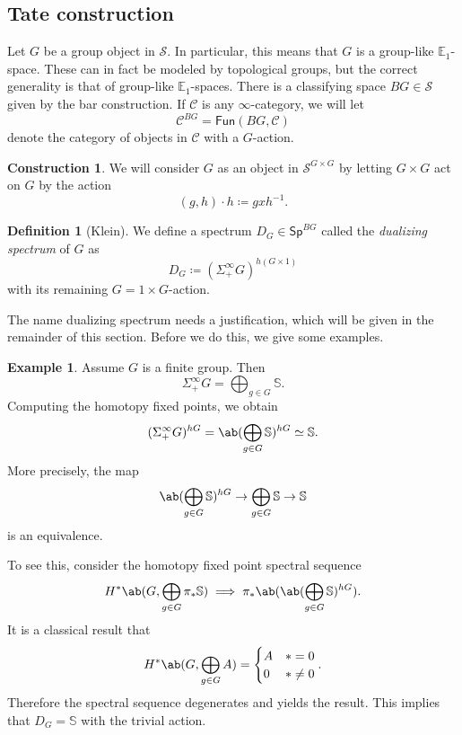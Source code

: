 \documentclass[10pt, oneside]{memoir}
\theoremstyle{definition}
\newtheorem{defn}[thm]{Definition}
\newtheorem{con}[thm]{Construction}
\newtheorem{exm}[thm]{Example}
\theoremstyle{remark}
\theoremstyle{plain}
\theoremstyle{definition}
\theoremstyle{remark}
\newcommand{\E}{\mathbb{E}}
\newcommand{\bS}{\mathbb{S}}
\newcommand{\mc}[1]{\mathcal{#1}}
\newcommand{\ms}[1]{\mathsf{#1}}
\newcommand{\1}{\mathbf{1}}
\newcommand{\2}{\mathbf{2}}
\newcommand{\3}{\mathbf{3}}
\begin{document}
\subsection{Tate construction}%
\label{sub:Tate construction}

Let $G$ be a group object in $\mc{S}$. In particular, this means that $G$ is a group-like $\E_1$-space. These can in fact be modeled by topological groups, but the correct generality is that of group-like $\E_1$-spaces. There is a classifying space $BG \in \mc{S}$ given by the bar construction. If $\mc{C}$ is any $\infty$-category, we will let
\[ \mc{C}^{BG} = \ms{Fun}(BG, \mc{C}) \]
denote the category of objects in $\mc{C}$ with a $G$-action.

\begin{con}
    We will consider $G$ as an object in $\mc{S}^{G \times G}$ by letting $G \times G$ act on $G$ by the action 
    \[ (g,h) \cdot h \coloneqq gxh^{-1}. \]
\end{con}

\begin{defn}[Klein]
    We define a spectrum $D_G \in \ms{Sp}^{BG}$ called the \textit{dualizing spectrum} of $G$ as
    \[ D_G \coloneqq (\Sigma_+^{\infty} G)^{h(G \times 1)} \]
    with its remaining $G = 1 \times G$-action.
\end{defn}

The name dualizing spectrum needs a justification, which will be given in the remainder of this section. Before we do this, we give some examples.

\begin{exm}
    Assume $G$ is a finite group. Then
    \[ \Sigma_+^{\infty} G = \bigoplus_{g \in G} \bS. \]
    Computing the homotopy fixed points, we obtain
    \[ (\Sigma_+^{\infty} G)^{hG} = \ab(\bigoplus_{g \in G} \bS)^{hG} \simeq \bS. \]
    More precisely, the map
    \[ \ab(\bigoplus_{g \in G} \bS)^{hG} \to \bigoplus_{g \in G} \bS \to \bS \]
    is an equivalence.

    To see this, consider the homotopy fixed point spectral sequence
    \[ H^* \ab(G, \bigoplus_{g \in G} \pi_* \bS) \implies \pi_* \ab(\ab(\bigoplus_{g \in G} \bS)^{hG}). \]
    It is a classical result that
    \[ H^*\ab(G, \bigoplus_{g \in G} A) = \begin{cases}
        A & *=0 \\
        0 & * \neq 0
    \end{cases}. \]
    Therefore the spectral sequence degenerates and yields the result. This implies that $D_G = \bS$ with the trivial action.
\end{exm}
\end{document}

